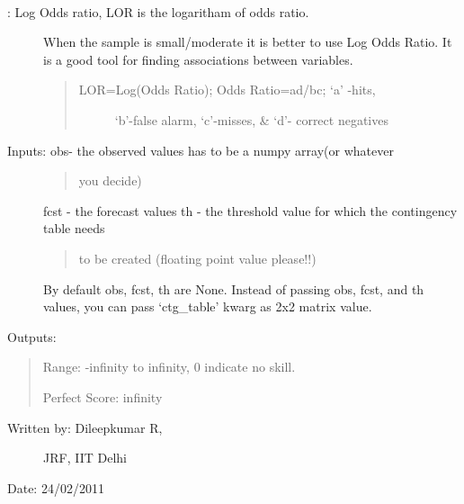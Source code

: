 \documentclass[letterpaper,10pt,english]{sphinxmanual}
\begin{document}

\begin{fulllineitems}
\label{diagnosis:ctgfunction.logodr}~\begin{description}
\item[{{\hyperref[diagnosis:ctgfunction.logodr]{}}: Log Odds ratio, LOR is the logaritham of odds ratio.}] \leavevmode
When the sample is small/moderate it is better to use Log
Odds Ratio. It is a good tool for finding associations
between variables.
\begin{quote}
\begin{description}
\item[{LOR=Log(Odds Ratio); Odds Ratio=ad/bc; `a' -hits,}] \leavevmode
`b'-false alarm, `c'-misses, \& `d'- correct negatives

\end{description}
\end{quote}

\item[{Inputs: obs- the observed values has to be a numpy array(or whatever}] \leavevmode\begin{quote}

you decide)
\end{quote}

fcst - the forecast values
th  - the threshold value for which the contingency table needs
\begin{quote}

to be created (floating point value please!!)
\end{quote}

By default obs, fcst, th are None. Instead of passing obs, fcst,
and th values, you can pass `ctg\_table' kwarg as 2x2 matrix value.

\end{description}

Outputs:
\begin{quote}

Range: -infinity to infinity, 0 indicate no skill.

Perfect Score: infinity
\end{quote}
\begin{description}
\item[{Written by: Dileepkumar R,}] \leavevmode
JRF, IIT Delhi

\end{description}

Date: 24/02/2011

\end{fulllineitems}
\end{document}
